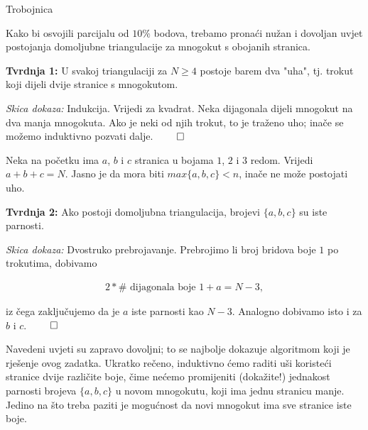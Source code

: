 \begin{statement}[
  problempoints=110,
  timelimit=1 second,
  memorylimit=512 MiB,
]{Trobojnica}



Kako bi osvojili parcijalu od $10\%$ bodova, trebamo pronaći nužan i dovoljan uvjet postojanja
domoljubne triangulacije za mnogokut s obojanih stranica.

\textbf{Tvrdnja 1: } \; U svakoj triangulaciji za $N \ge 4$ postoje barem dva "uha", tj. trokut
koji dijeli dvije stranice s mnogokutom.

\emph{Skica dokaza: } \; Indukcija. Vrijedi za kvadrat.
Neka dijagonala dijeli mnogokut na dva manja mnogokuta. Ako je neki od njih trokut, to je traženo uho;
inače se možemo induktivno pozvati dalje. $\qed$

Neka na početku ima $a$, $b$ i $c$ stranica u bojama $1$, $2$ i $3$ redom.
Vrijedi $a+b+c = N$. Jasno je da mora biti $max\{a, b, c\} < n$, inače ne može postojati uho.

\textbf{Tvrdnja 2: } \; Ako postoji domoljubna triangulacija, brojevi $\{a, b, c\}$ su iste parnosti.

\emph{Skica dokaza: } \; Dvostruko prebrojavanje.
Prebrojimo li broj bridova boje $1$ po trokutima, dobivamo 

\begin{align*}
  2 * \text{# dijagonala boje 1} + a = N - 3,
\end{align*}

iz čega zaključujemo da je $a$ iste parnosti kao $N-3$. Analogno dobivamo isto i za $b$ i $c$. $\qed$

Navedeni uvjeti su zapravo dovoljni; to se najbolje dokazuje algoritmom koji je rješenje ovog zadatka.
Ukratko rečeno, induktivno ćemo raditi uši koristeći stranice dvije različite boje,
čime nećemo promijeniti (dokažite!) jednakost parnosti brojeva $\{a, b, c\}$ u novom mnogokutu, koji
ima jednu stranicu manje.
Jedino na što treba paziti je mogućnost da novi mnogokut ima sve stranice iste boje.


\end{statement}
